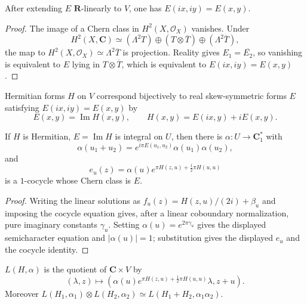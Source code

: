 \begin{corollary}
\label{mumford-source-chern-type}
After extending $E$ $\mathbf R$-linearly to $V$, one has
$E(ix,iy)=E(x,y)$.
\end{corollary}
\begin{proof}
The image of a Chern class in $H^2(X,\mathcal O_X)$ vanishes. Under
\[
 H^2(X,\mathbf C)\simeq(\Lambda^2T)\oplus(T\otimes\overline T)
 \oplus(\Lambda^2\overline T),
\]
the map to $H^2(X,\mathcal O_X)\simeq\Lambda^2\overline T$ is projection.
Reality gives $E_1=\overline{E_2}$, so vanishing is equivalent to $E$ lying
in $T\otimes\overline T$, which is equivalent to $E(ix,iy)=E(x,y)$.
\end{proof}


\begin{lemma}
\label{mumford-source-hermitian-correspondence}
Hermitian forms $H$ on $V$ correspond bijectively to real skew-symmetric forms
$E$ satisfying $E(ix,iy)=E(x,y)$ by
\[
 E(x,y)=\operatorname{Im}H(x,y),\qquad H(x,y)=E(ix,y)+iE(x,y).
\]
\notready
\end{lemma}

\begin{lemma}[Semicharacters]
\label{mumford-source-semicharacter}
If $H$ is Hermitian, $E=\operatorname{Im}H$ is integral on $U$, then there is
$\alpha:U\to\mathbf C_1^*$ with
\[
 \alpha(u_1+u_2)=e^{i\pi E(u_1,u_2)}\alpha(u_1)\alpha(u_2),
\]
and
\[
 e_u(z)=\alpha(u)e^{\pi H(z,u)+\frac12\pi H(u,u)}
\]
is a $1$-cocycle whose Chern class is $E$.
\end{lemma}
\begin{proof}
Writing the linear solutions as $f_u(z)=H(z,u)/(2i)+\beta_u$ and imposing
the cocycle equation gives, after a linear coboundary normalization, pure
imaginary constants $\gamma_u$. Setting $\alpha(u)=e^{2\pi\gamma_u}$ gives
the displayed semicharacter equation and $|\alpha(u)|=1$; substitution gives
the displayed $e_u$ and the cocycle identity.
\end{proof}

\begin{definition}
\label{mumford-source-LHa}
$L(H,\alpha)$ is the quotient of $\mathbf C\times V$ by
\[
 (\lambda,z)\longmapsto
 (\alpha(u)e^{\pi H(z,u)+\frac12\pi H(u,u)}\lambda,z+u).
\]
Moreover $L(H_1,\alpha_1)\otimes L(H_2,\alpha_2)\simeq
L(H_1+H_2,\alpha_1\alpha_2)$.
\end{definition}

